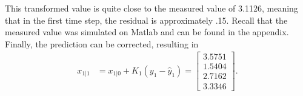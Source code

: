 \begin{enumerate}
\noindent This transformed value is quite close to the measured value of 3.1126, meaning that in the first time step, the residual is approximately .15. Recall that the measured value was simulated on Matlab and can be found in the appendix.\\

\noindent Finally, the prediction can be corrected, resulting in
\begin{align*}
 x_{1|1}&=
  x_{1|0} + K_1 (y_1 - \hat y_1) =
\begin{bmatrix}
3.5751\\
1.5404 \\
2.7162 \\
3.3346
\end{bmatrix}.
\end{align*}

\end{enumerate}


